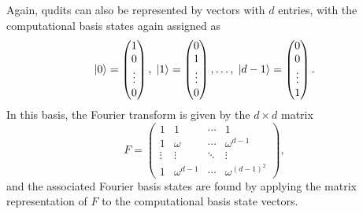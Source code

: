 Again, qudits can also be represented by vectors with $d$ entries, with the computational basis states again assigned as
\begin{equation}
    \ket{0} = 
    \begin{pmatrix}
        1 \\
        0 \\
        \vdots\\
        0
    \end{pmatrix}, \;
    \ket{1} = 
    \begin{pmatrix}
        0 \\
        1 \\
        \vdots \\
        0
    \end{pmatrix}, \dots, \;
    \ket{d - 1} =
    \begin{pmatrix}
        0 \\
        0 \\
        \vdots \\
        1
    \end{pmatrix}.
\end{equation}
In this basis, the Fourier transform is given by the $d\times d$ matrix
\begin{equation}
    F = \begin{pmatrix}
        1 & 1 & \cdots & 1\\
        1 & \omega & \cdots & \omega^{d-1}\\
        \vdots & \vdots & \ddots & \vdots\\
        1 & \omega^{d-1} & \cdots & \omega^{{(d-1)}^2}
    \end{pmatrix},
\end{equation}
and the associated Fourier basis states are found by applying the matrix representation of $F$ to the computational basis state vectors.

